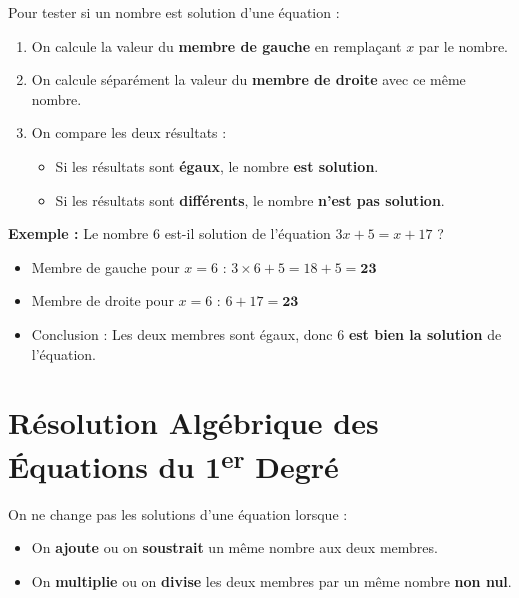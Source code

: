 \begin{cadremethode}
Pour tester si un nombre est solution d'une équation :
\begin{enumerate}
    \item On calcule la valeur du \textbf{membre de gauche} en remplaçant $x$ par le nombre.
    \item On calcule séparément la valeur du \textbf{membre de droite} avec ce même nombre.
    \item On compare les deux résultats :
    \begin{itemize}
        \item Si les résultats sont \textbf{égaux}, le nombre \textbf{est solution}.
        \item Si les résultats sont \textbf{différents}, le nombre \textbf{n'est pas solution}.
    \end{itemize}
\end{enumerate}

\textbf{Exemple :} Le nombre $6$ est-il solution de l'équation $3x + 5 = x + 17$ ?
\begin{itemize}
    \item Membre de gauche pour $x = 6$ : $3 \times 6 + 5 = 18 + 5 = \mathbf{23}$
    \item Membre de droite pour $x = 6$ : $6 + 17 = \mathbf{23}$
    \item Conclusion : Les deux membres sont égaux, donc $6$ \textbf{est bien la solution} de l'équation.
\end{itemize}
\end{cadremethode}

\section{Résolution Algébrique des Équations du 1\textsuperscript{er} Degré}

\begin{cadreprop}
On ne change pas les solutions d'une équation lorsque :
\begin{itemize}
    \item On \textbf{ajoute} ou on \textbf{soustrait} un même nombre aux deux membres.
    \item On \textbf{multiplie} ou on \textbf{divise} les deux membres par un même nombre \textbf{non nul}.
\end{itemize}
\end{cadreprop}

